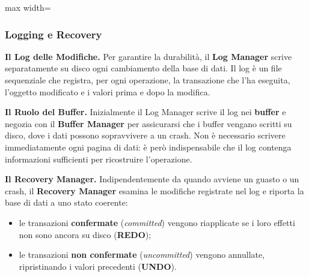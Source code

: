 \documentclass[12pt]{extarticle}
\begin{document}
\begin{center}
\begin{adjustbox}{max width=\linewidth}
\end{adjustbox}
\end{center}

\subsubsection{Logging e Recovery}

\noindent \textbf{Il Log delle Modifiche.} Per garantire la durabilità, il \textbf{Log Manager} scrive separatamente su disco ogni cambiamento della base di dati. Il log è un file sequenziale che registra, per ogni operazione, la transazione che l'ha eseguita, l'oggetto modificato e i valori prima e dopo la modifica.

\medskip
\noindent \textbf{Il Ruolo del Buffer.} Inizialmente il Log Manager scrive il log nei \textbf{buffer} e negozia con il \textbf{Buffer Manager} per assicurarsi che i buffer vengano scritti su disco, dove i dati possono sopravvivere a un crash. Non è necessario scrivere immediatamente ogni pagina di dati: è però indispensabile che il log contenga informazioni sufficienti per ricostruire l'operazione.

\medskip
\noindent \textbf{Il Recovery Manager.} Indipendentemente da quando avviene un guasto o un crash, il \textbf{Recovery Manager} esamina le modifiche registrate nel log e riporta la base di dati a uno stato coerente:
\begin{itemize}
    \item le transazioni \textbf{confermate} (\textit{committed}) vengono riapplicate se i loro effetti non sono ancora su disco (\textbf{REDO});
    \item le transazioni \textbf{non confermate} (\textit{uncommitted}) vengono annullate, ripristinando i valori precedenti (\textbf{UNDO}).
\end{itemize}
\end{document}
